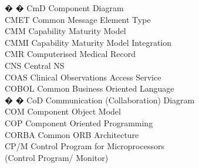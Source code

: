 \begin{tabbing}


� � \>CmD \>\>Component Diagram\\

    \>CMET \>\>Common Message Element Type\\

    \>CMM \>\>Capability Maturity Model\\

    \>CMMI \>\>Capability Maturity Model Integration\\

    \>CMR \>\>Computerised Medical Record\\



    \>CNS \>\>Central NS\\

    \>COAS \>\>Clinical Observations Access Service\\

    \>COBOL \>\>Common Business Oriented Language\\

� � \>CoD \>\>Communication (Collaboration) Diagram\\

    \>COM \>\>Component Object Model\\



    \>COP \>\>Component Oriented Programming\\

    \>CORBA \>\>Common ORB Architecture\\


    \>CP/M \>\>Control Program for Microprocessors\\
        \>\>\>(Control Program/ Monitor)\\



\end{tabbing}
